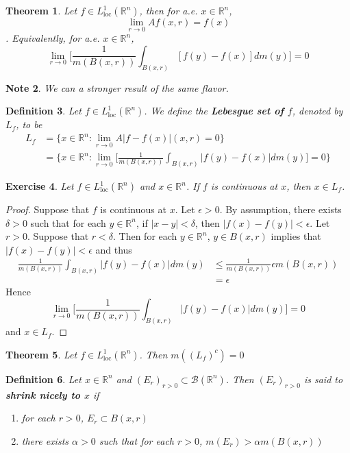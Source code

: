 \documentclass[12pt]{amsart}
\newtheorem{thm}{Theorem}[subsection]
\newtheorem{defn}[thm]{Definition}
\newtheorem{note}[thm]{Note}
\newtheorem{ex}[thm]{Exercise}
\newcommand{\al}{\alpha}
\newcommand{\del}{\delta}
\newcommand{\ep}{\epsilon}
\newcommand{\R}{\mathbb{R}}
\newcommand{\MB}{\mathcal{B}}
\newcommand{\Ll}{L^1_{\text{loc}}(\R^n)}
\begin{document}
\begin{thm}
	Let $f \in \Ll$, then for a.e. $x \in \R^n$, $$\lim_{r \rightarrow 0} Af(x,r) =f(x)$$. Equivalently, for a.e. $x \in \R^n$, $$ \lim_{r \rightarrow 0} \bigg[ \frac{1}{m(B(x,r))}\int_{B(x,r)}[f(y)-f(x)]dm(y)\bigg] =0$$
\end{thm}

\begin{note}
	We can a stronger result of the same flavor.
\end{note}

\begin{defn}
	Let $f \in \Ll$. We define the \textbf{Lebesgue set of $f$}, denoted by $L_f$, to be 
	\begin{align*}
		L_f 
		&= \{x \in \R^n: \lim_{r \rightarrow 0} A|f-f(x)|(x,r) =0 \}\\
		&= \bigg \{x \in \R^n: \lim_{r \rightarrow 0} \bigg[ \frac{1}{m(B(x,r))}\int_{B(x,r)}|f(y) - f(x)|dm(y)\bigg] =0 \bigg \}
	\end{align*}
\end{defn}

\begin{ex}
	Let $f \in \Ll$ and $x \in \R^n$. If $f$ is continuous at $x$, then $x \in L_f$.
\end{ex}

\begin{proof}
	Suppose that $f$ is continuous at $x$. Let $\ep > 0$. By assumption, there exists $\del >0$ such that for each $y \in \R^n$, if $|x-y|< \del$, then $|f(x)-f(y)| < \ep$. Let $r >0$. Suppose that $r< \del$. Then for each $y \in \R^n$, $y \in B(x,r)$ implies that $|f(x) - f(y)| < \ep$ and thus 
	\begin{align*}
		\frac{1}{m(B(x,r))}\int_{B(x,r)}|f(y) - f(x)|dm(y)
		& \leq \frac{1}{m(B(x,r))} \ep m(B(x,r))\\
		&=\ep
	\end{align*}
	Hence $$\lim_{r \rightarrow 0} \bigg[ \frac{1}{m(B(x,r))}\int_{B(x,r)}|f(y) - f(x)|dm(y)\bigg] =0$$ 
	and $x \in L_f$.
\end{proof}

\begin{thm}
	Let $f \in \Ll$. Then $m((L_f)^c) = 0$
\end{thm}

\begin{defn}
	Let $x \in \R^n$ and $(E_r)_{r>0} \subset \MB(\R^n)$. Then $(E_r)_{r>0}$ is said to \textbf{shrink nicely to $x$} if 
	
	\begin{enumerate}
		\item for each $r>0$, $E_r \subset B(x,r)$
		\item there exists $\al >0$ such that for each $r>0$, $m(E_r)> \al m(B(x,r))$
	\end{enumerate} 
\end{defn}
\end{document}
